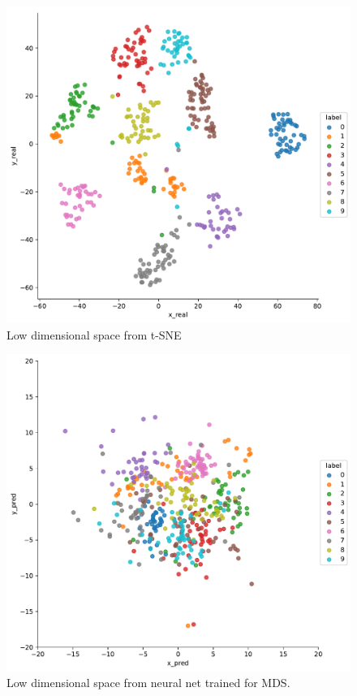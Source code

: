 \documentclass[a4paper,11pt,spanish]{report}
\begin{document}
\begin{figure}[p]
\centering
\includegraphics[width=12cm]{figures/app1plotreal.pdf}
\caption{\label{figureTSNE}Low dimensional space from t-SNE}
\end{figure}

\begin{figure}[p]
\centering
\includegraphics[width=12cm]{figures/app1plotpredictionsmds.pdf}
\caption{\label{figureNN}Low dimensional space from neural net trained for MDS.}
\end{figure}
\end{document}
